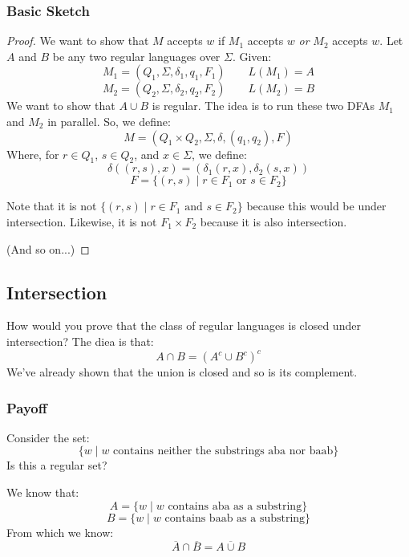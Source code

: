 \documentclass[letterpaper]{article}
\begin{document}
\subsubsection{Basic Sketch}
\begin{mdframed}[]
    \begin{proof}
        We want to show that $M$ accepts $w$ if $M_1$ accepts $w$ \emph{or} $M_2$ accepts $w$. Let $A$ and $B$ be any two regular languages over $\Sigma$. Given:
        \[M_1 = (Q_1, \Sigma, \delta_1, q_1, F_1) \qquad L(M_1) = A\]
        \[M_2 = (Q_2, \Sigma, \delta_2, q_2, F_2) \qquad L(M_2) = B\]
        We want to show that $A \cup B$ is regular. The idea is to run these two DFAs $M_1$ and $M_2$ in parallel. So, we define: 
        \[M = (Q_1 \times Q_2, \Sigma, \delta, (q_1, q_2), F)\]
        Where, for $r \in Q_1$, $s \in Q_2$, and $x \in \Sigma$, we define:
        \[\delta((r, s), x) = (\delta_{1}(r, x), \delta_{2}(s, x))\]
        \[F = \{(r, s) \mid r \in F_1 \text{ or } s \in F_2\}\]
        \begin{mdframed}[]
            Note that it is not $\{(r, s) \mid r \in F_1 \text{ and } s \in F_2\}$ because this would be under intersection. Likewise, it is not $F_1 \times F_2$ because it is also intersection. 
        \end{mdframed}

        (And so on...)
    \end{proof}
\end{mdframed}

\subsection{Intersection}
How would you prove that the class of regular languages is closed under intersection? The diea is that:
\[A \cap B = (A^c \cup B^c)^c\]
We've already shown that the union is closed and so is its complement. 

\subsubsection{Payoff}
Consider the set: 
\[
    \{w \mid w \text{ contains neither the substrings aba nor baab}\}  
\]
Is this a regular set? 

\begin{mdframed}[]
    We know that:
    \[A = \{w \mid w \text{ contains aba as a substring}\}\]
    \[B = \{w \mid w \text{ contains baab as a substring}\}\]
    From which we know: 
    \[\overline{A} \cap \overline{B} = \overline{A \cup B}\]
\end{mdframed}
\end{document}
